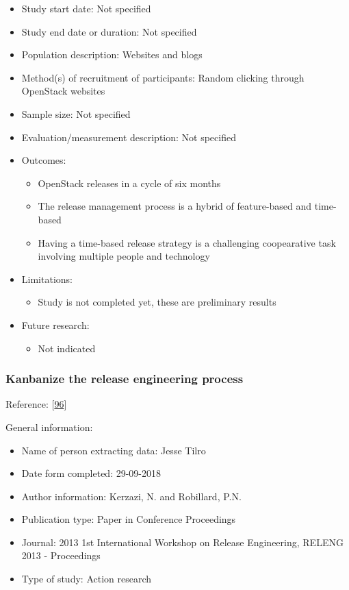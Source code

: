 \documentclass[]{book}
\providecommand{\tightlist}{%
  \setlength{\itemsep}{0pt}\setlength{\parskip}{0pt}}
\begin{document}
\begin{itemize}
\tightlist
\item
  Study start date: Not specified
\item
  Study end date or duration: Not specified
\item
  Population description: Websites and blogs
\item
  Method(s) of recruitment of participants: Random clicking through
  OpenStack websites
\item
  Sample size: Not specified
\item
  Evaluation/measurement description: Not specified
\item
  Outcomes:

  \begin{itemize}
  \tightlist
  \item
    OpenStack releases in a cycle of six months
  \item
    The release management process is a hybrid of feature-based and
    time-based
  \item
    Having a time-based release strategy is a challenging coopearative
    task involving multiple people and technology
  \end{itemize}
\item
  Limitations:

  \begin{itemize}
  \tightlist
  \item
    Study is not completed yet, these are preliminary results
  \end{itemize}
\item
  Future research:

  \begin{itemize}
  \tightlist
  \item
    Not indicated
  \end{itemize}
\end{itemize}

\subsubsection{Kanbanize the release engineering
process}\label{kanbanize-the-release-engineering-process}

Reference: {[}\protect\hyperlink{ref-kerzazi2013a}{96}{]}

General information:

\begin{itemize}
\tightlist
\item
  Name of person extracting data: Jesse Tilro
\item
  Date form completed: 29-09-2018
\item
  Author information: Kerzazi, N. and Robillard, P.N.
\item
  Publication type: Paper in Conference Proceedings
\item
  Journal: 2013 1st International Workshop on Release Engineering,
  RELENG 2013 - Proceedings
\item
  Type of study: Action research
\end{itemize}
\end{document}
